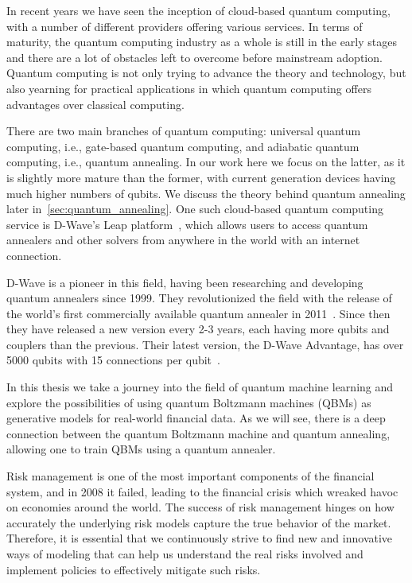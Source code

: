 In recent years we have seen the inception of cloud-based quantum computing, with a number of different providers offering various services.
In terms of maturity, the quantum computing industry as a whole is still in the early stages and there are a lot of obstacles left to overcome before mainstream adoption.
Quantum computing is not only trying to advance the theory and technology, but also yearning for practical applications in which quantum computing offers advantages over classical computing.

There are two main branches of quantum computing: universal quantum computing, i.e., gate-based quantum computing, and adiabatic quantum computing, i.e., quantum annealing.
In our work here we focus on the latter, as it is slightly more mature than the former, with current generation devices having much higher numbers of qubits.
We discuss the theory behind quantum annealing later in~\cref{sec:quantum_annealing}.
One such cloud-based quantum computing service is D-Wave's Leap platform~\cite{dwave_leap}, which allows users to access quantum annealers and other solvers from anywhere in the world with an internet connection.

D-Wave is a pioneer in this field, having been researching and developing quantum annealers since 1999.
They revolutionized the field with the release of the world's first commercially available quantum annealer in 2011~\cite{zyga_2011}.
Since then they have released a new version every 2-3 years, each having more qubits and couplers than the previous.
Their latest version, the D-Wave Advantage, has over 5000 qubits with 15 connections per qubit~\cite{dwave_advantage}.

In this thesis we take a journey into the field of quantum machine learning and explore the possibilities of using quantum Boltzmann machines (QBMs) as generative models for real-world financial data.
As we will see, there is a deep connection between the quantum Boltzmann machine and quantum annealing, allowing one to train QBMs using a quantum annealer.

Risk management is one of the most important components of the financial system, and in 2008 it failed, leading to the financial crisis which wreaked havoc on economies around the world.
The success of risk management hinges on how accurately the underlying risk models capture the true behavior of the market.
Therefore, it is essential that we continuously strive to find new and innovative ways of modeling that can help us understand the real risks involved and implement policies to effectively mitigate such risks.

